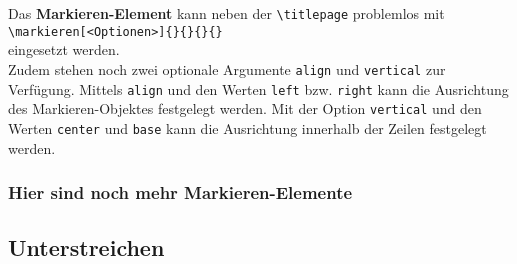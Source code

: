 \documentclass[rgb]{beamer}
\begin{document}
\begin{frame}[t]
	\subsectionpage
	Das \textbf{Markieren-Element} kann neben der \texttt{\textbackslash titlepage} problemlos mit\\
	\hskip 1cm \texttt{\textbackslash markieren[<Optionen>]\{<Zeile 1>\}\{<Zeile 2>\}\{<Zeile 3>\}\{<Zeile 4>\}}\\
	eingesetzt werden.\\[\baselineskip]
	Zudem stehen noch zwei optionale Argumente \texttt{align} und \texttt{vertical} zur Verfügung. Mittels \texttt{align} und den Werten \texttt{left} bzw. \texttt{right} kann die Ausrichtung des Markieren-Objektes festgelegt werden. Mit der Option \texttt{vertical} und den Werten \texttt{center} und \texttt{base} kann die Ausrichtung innerhalb der Zeilen festgelegt werden.
	\vskip 18pt
	\\

\end{frame}

\begin{frame}[t]
	\frametitle{Hier sind noch mehr Markieren-Elemente}%
	\vskip 18pt%
	\begin{flushright}%
	\end{flushright}%
\end{frame}





\subsection{Unterstreichen}


%
%
%
%
%
% 
%
%
%
\end{document}

